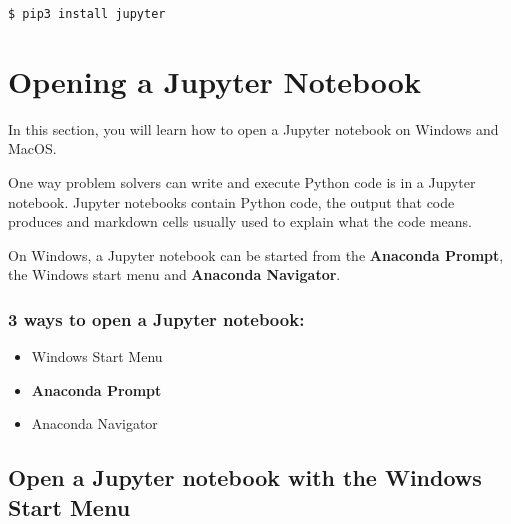 \documentclass{book}
\begin{document}
\begin{lstlisting}
$ pip3 install jupyter
\end{lstlisting}
    




    
        \hypertarget{opening-a-jupyter-notebook}{%
\section{Opening a Jupyter Notebook}\label{opening-a-jupyter-notebook}}
    




    
        In this section, you will learn how to open a Jupyter notebook on
Windows and MacOS.

One way problem solvers can write and execute Python code is in a
Jupyter notebook. Jupyter notebooks contain Python code, the output that
code produces and markdown cells usually used to explain what the code
means.

On Windows, a Jupyter notebook can be started from the \textbf{Anaconda
Prompt}, the Windows start menu and \textbf{Anaconda Navigator}.

\hypertarget{ways-to-open-a-jupyter-notebook}{%
\subsubsection{\texorpdfstring{3 ways to open a \textbf{Jupyter
notebook}:}{3 ways to open a Jupyter notebook:}}\label{ways-to-open-a-jupyter-notebook}}

\begin{itemize}
\item
  Windows Start Menu
\item
  \textbf{Anaconda Prompt}
\item
  Anaconda Navigator
\end{itemize}
    




    
        \hypertarget{open-a-jupyter-notebook-with-the-windows-start-menu}{%
\subsection{Open a Jupyter notebook with the Windows Start
Menu}\label{open-a-jupyter-notebook-with-the-windows-start-menu}}
    
\end{document}
